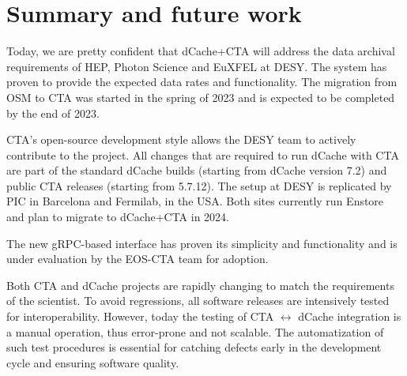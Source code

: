 \documentclass{webofc}
\begin{document}
\section{Summary and future work}
\label{summary}

Today, we are pretty confident that dCache+CTA will address the data archival requirements of HEP, Photon Science and EuXFEL at DESY. The system has proven to provide the expected data rates and functionality. The migration from OSM to CTA was started in the spring of 2023 and is expected to be completed by the end of 2023.

CTA's open-source development style allows the DESY team to actively contribute to the project. All changes that are required to run dCache with CTA are part of the standard dCache builds (starting from dCache version 7.2) and public CTA releases (starting from 5.7.12). The setup at DESY is replicated by PIC in Barcelona and Fermilab, in the USA. Both sites currently run Enstore\cite{enstore} and plan to migrate to dCache+CTA in 2024.
 
The new gRPC-based interface has proven its simplicity and functionality and is under evaluation by the EOS-CTA team for adoption.

Both CTA and dCache projects are rapidly changing to match the requirements of the scientist. To avoid regressions, all software releases are intensively tested for interoperability. However, today the testing of CTA $\leftrightarrow$ dCache integration is a manual operation, thus error-prone and not scalable. The automatization of such test procedures is essential for catching defects early in the development cycle and ensuring software quality.

\newpage

\end{document}
